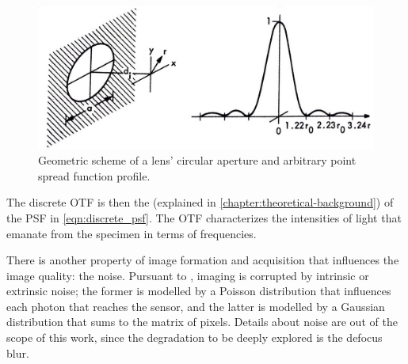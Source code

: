 \begin{figure}[htb]
	\centering
	\caption{\label{fig:discrete_psf_scheme} Geometric scheme of a lens' circular aperture and arbitrary point spread function profile.} 
	\begin{center}
	    \includegraphics[scale=0.35]{images/discrete_psf_scheme.jpeg}
	\end{center}
	\centering
\end{figure}

The discrete OTF is then the  (explained in \autoref{chapter:theoretical-background}) of the PSF in \autoref{eqn:discrete_psf}. The OTF characterizes the intensities of light that emanate from the specimen in terms of frequencies. 

There is another property of image formation and acquisition that influences the image quality: the noise. Pursuant to , imaging is corrupted by intrinsic or extrinsic noise; the former is modelled by a Poisson distribution that influences each photon that reaches the sensor, and the latter is modelled by a Gaussian distribution that sums to the matrix of pixels. Details about noise are out of the scope of this work, since the degradation to be deeply explored is the defocus blur.